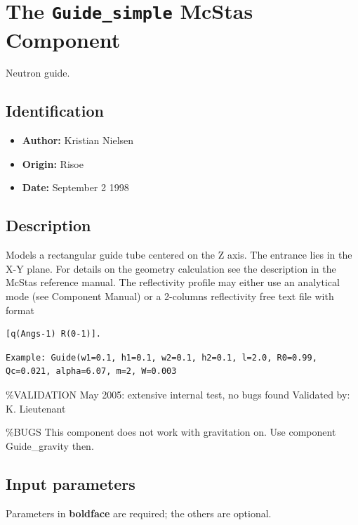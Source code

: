 \section{The \texttt{Guide\_simple} McStas Component}
Neutron guide.

\subsection*{Identification}
\begin{itemize}
  \item \textbf{Author:} Kristian Nielsen
  \item \textbf{Origin:} Risoe
  \item \textbf{Date:} September 2 1998
\end{itemize}

\subsection*{Description}
Models a rectangular guide tube centered on the Z axis. The entrance lies in the X-Y plane. For details on the geometry calculation see the description in the McStas reference manual. The reflectivity profile may either use an analytical mode (see Component Manual) or a 2-columns reflectivity free text file with format

\begin{verbatim}
[q(Angs-1) R(0-1)].
\end{verbatim}

\begin{verbatim}
Example: Guide(w1=0.1, h1=0.1, w2=0.1, h2=0.1, l=2.0, R0=0.99, Qc=0.021, alpha=6.07, m=2, W=0.003
\end{verbatim}

\%VALIDATION May 2005: extensive internal test, no bugs found Validated by: K. Lieutenant

\%BUGS This component does not work with gravitation on. Use component Guide\_gravity then.

\subsection*{Input parameters}
Parameters in \textbf{boldface} are required; the others are optional.

